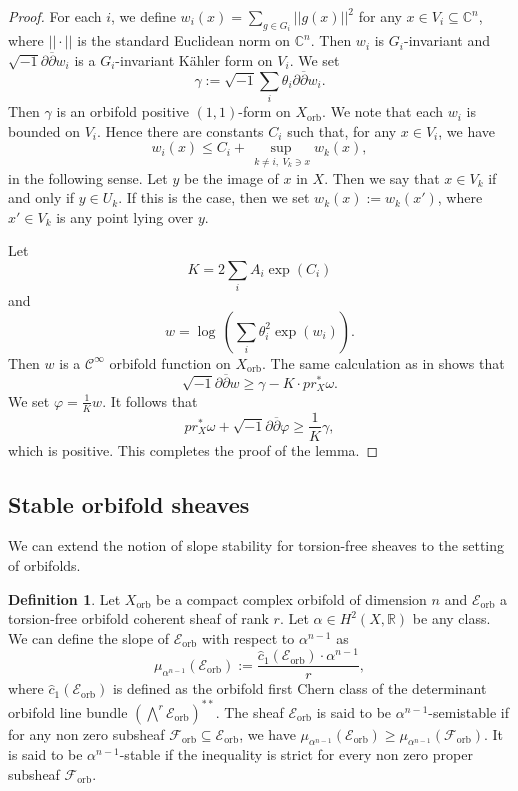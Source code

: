 \documentclass[12pt]{amsart}
\newcommand{\<}{\leq}
\def\>{\geq}
\def\mcE{\mathcal{E}}
\def\mcF{\mathcal{F}}
\theoremstyle{remark}
\theoremstyle{definition}
\newtheorem{definition}[theorem]{Definition}
\theoremstyle{definition}
\numberwithin{equation}{section}
\theoremstyle{definition}
\theoremstyle{definition}
\def\orb{\mathrm{orb}}
\begin{document}
\begin{proof}
For each $i$, we define  
$w_i ({x}) =  \sum_{g\in G_i} ||g( {x})||^2$ for any $ {x}\in V_i\subseteq \mathbb{C}^n$,
where $||\cdot||$ is the standard Euclidean norm on $\mathbb{C}^n$. 
Then $w_i$ is $G_i$-invariant and $\sqrt{-1} \partial\overline{\partial} w_i$ is a  $G_i$-invariant K\"ahler form on $V_i$.
We set
\[
\gamma:= \sqrt{-1}\sum_i \theta_i \partial\overline{\partial} w_i. 
\]
Then $\gamma$ is an orbifold positive $(1,1)$-form on $X_{\orb}$.  
We note that each $w_i$ is bounded on $V_i$. 
Hence  there are constants $C_i$ such that, for any  $x\in V_i$, we have  
\[
w_i(x) \< C_i + \sup_{\ k\neq i,\ V_k\ni x} w_k(x), 
\]
in the following sense. 
Let $y$ be the image of $x$ in $X$. 
Then we say that $x\in V_k$ if and only if $y\in U_k$. 
If this is the case, then we set $w_k(x) := w_k(x')$, where $x'\in V_k$ is any point lying over $y$.    


Let 
\[
K= 2\sum_i A_i \exp(C_i)
\]
and 
\[
w= \log\, \left(\sum_i \theta_i^2 \exp(w_i)\right).
\]
Then $w$ is a $\mathcal{C}^\infty$ orbifold function on $X_{\orb}$. 
The same calculation as in \cite[Lemma 3.5]{Dem92} shows that 
\[
\sqrt{-1} \partial\overline{\partial} w \> \gamma - K\cdot pr_X^* \omega. 
\]
We set 
$\varphi = \frac{1}{K} w$. 
It follows that 
\[
pr_X^* \omega + \sqrt{-1}\partial\overline{\partial} \varphi \> \frac{1}{K} \gamma,
\]
which is positive. 
This completes the proof of the lemma. 
\end{proof}


\subsection{Stable orbifold sheaves} 
 
We can extend the notion of slope stability for torsion-free sheaves to the setting of  orbifolds. 


\begin{definition}\label{def:orbifold-stability}
Let $X_{\orb}$ be a  compact complex orbifold of dimension $n$ and $\mcE_{\orb}$ a torsion-free orbifold coherent sheaf of rank $r$.  
Let $\alpha\in H^2(X,\mathbb{R})$ be any class. 
We can define the slope of $\mcE_{\orb}$ with respect to $\alpha^{n-1}$ as
\[
\mu_{\alpha^{n-1}}(\mcE_{\orb}):= \frac{\hat{c}_1(\mcE_{\orb}) \cdot \alpha^{n-1}}{r},
\]
where $\hat{c}_1(\mcE_{\orb})$ is defined as the orbifold first Chern class of the determinant orbifold  line bundle  $(\bigwedge^r \mcE_{\orb})^{**}$.  
The sheaf $\mcE_{\orb}$ is said to be $\alpha^{n-1}$-semistable if for any non zero  subsheaf $\mcF_{\orb} \subseteq \mcE_{\orb}$, we have $\mu_{\alpha^{n-1}}(\mcE_{\orb}) \> \mu_{\alpha^{n-1}}(\mcF_{\orb})$.
It is said to be $\alpha^{n-1}$-stable if the inequality  is  strict for every non zero proper subsheaf $\mcF_{\orb}$. 
\end{definition}
\end{document}
